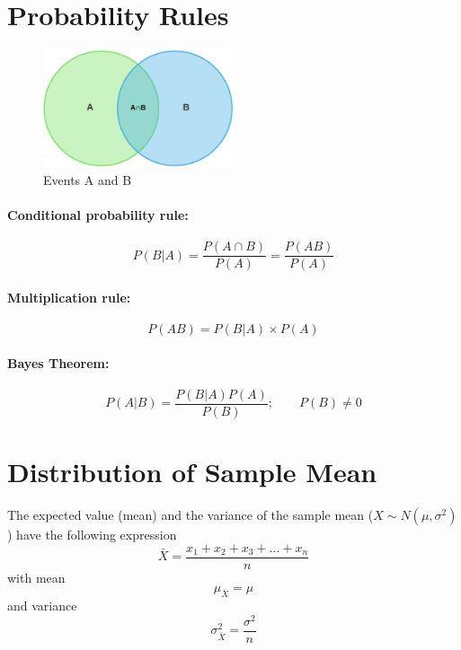 \documentclass{article}
\begin{document}
\section{Probability Rules}

\begin{figure}[h!]
    \centering
    \includegraphics[width=0.5\textwidth]{img/venn.png}
    \caption{Events A and B}
    \label{fig:venn}
\end{figure}

\paragraph{Conditional probability rule:}
\begin{equation}
    P(B|A)=\frac{P(A\cap B)}{P(A)}=\frac{P(AB)}{P(A)}
\end{equation}

\paragraph{Multiplication rule:}
\begin{equation}
    P(AB)=P(B|A)\times P(A)
\end{equation}

\paragraph{Bayes Theorem:}
\begin{equation}
    P(A|B)=\frac{P(B|A)P(A)}{P(B)}; \qquad P(B)\neq 0
\end{equation}

\section{Distribution of Sample Mean}

The expected value (mean) and the variance of the sample mean ($X\sim N(\mu, \sigma^2)$) have the following expression
\begin{equation}
    \bar{X}=\frac{x_1+x_2+x_3+\ldots+x_n}{n}
\end{equation}
with mean
\begin{equation}
    \mu_{\bar{X}}=\mu
\end{equation}
and variance
\begin{equation}
    \sigma^2_{\bar{X}}=\frac{\sigma^2}{n}
\end{equation}
\end{document}
